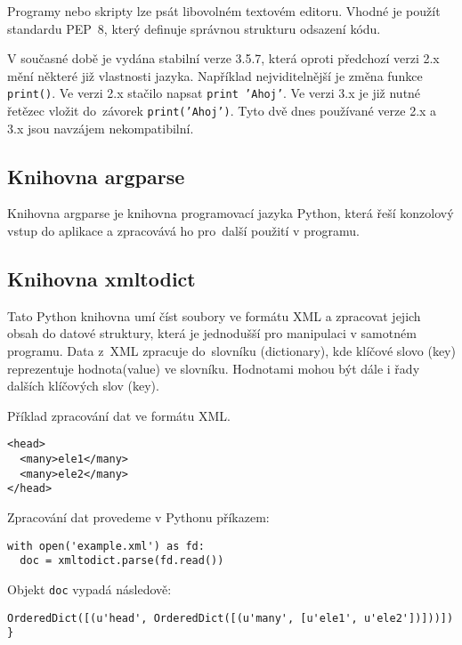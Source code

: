 Programy nebo skripty lze psát libovolném textovém editoru. Vhodné je
použít standardu PEP~8, který definuje správnou strukturu odsazení kódu.

V současné době je vydána stabilní verze 3.5.7, která oproti předchozí
verzi 2.x mění některé již  vlastnosti jazyka. Například 
nejviditelnější je změna funkce {\tt print()}. Ve verzi 2.x stačilo napsat
 {\tt print 'Ahoj'}. Ve verzi 3.x je již nutné řetězec vložit
do~závorek  {\tt print('Ahoj')}. Tyto dvě dnes používané verze 2.x
a 3.x jsou navzájem nekompatibilní.
\cite{python} 
\cite{wikiPython} 
  
\subsection{Knihovna argparse}
\label{argparse} 
Knihovna argparse je knihovna 
programovací jazyka Python, která řeší konzolový vstup do aplikace a 
zpracovává ho pro~další použití v programu.\cite{argparse}

\subsection{Knihovna xmltodict}
\label{xmltodict} 
Tato Python knihovna umí číst soubory ve formátu XML a zpracovat jejich obsah do datové struktury, která je jednodušší pro manipulaci v samotném
programu. Data z~XML zpracuje do~slovníku (dictionary), kde klíčové slovo (key) reprezentuje hodnota(value) ve slovníku.
Hodnotami mohou být dále i řady dalších klíčových slov (key).\cite{xmltodict}

Příklad zpracování dat ve formátu XML.

{\scriptsize
\begin{lstlisting}
<head>
  <many>ele1</many>
  <many>ele2</many>
</head>
\end{lstlisting}
}

Zpracování dat provedeme v Pythonu příkazem:

{\scriptsize
\lstset{language=Python}
\begin{lstlisting}
with open('example.xml') as fd: 
  doc = xmltodict.parse(fd.read()) 
\end{lstlisting}
}

Objekt {\tt doc} vypadá následově:

{\scriptsize
\lstset{language=Python}
\begin{lstlisting}
OrderedDict([(u'head', OrderedDict([(u'many', [u'ele1', u'ele2'])]))]) }
\end{lstlisting}
}

